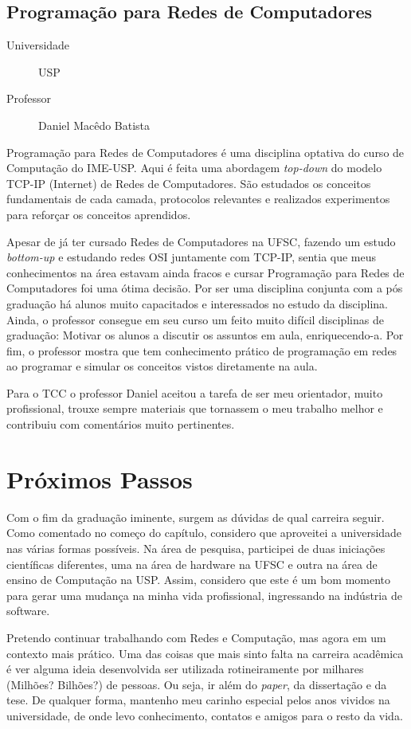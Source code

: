 \subsection{Programação para Redes de Computadores}
\begin{description}
	\item[Universidade] USP
	\item[Professor] Daniel Macêdo Batista
\end{description}

Programação para Redes de Computadores é uma disciplina optativa do curso de
Computação do IME-USP. Aqui é feita uma abordagem \emph{top-down} do modelo
TCP-IP (Internet) de Redes de Computadores. São estudados os conceitos
fundamentais de cada camada, protocolos relevantes e realizados experimentos
para reforçar os conceitos aprendidos.

Apesar de já ter cursado Redes de Computadores na UFSC, fazendo um estudo
\emph{bottom-up} e estudando redes OSI juntamente com TCP-IP, sentia que meus 
conhecimentos na área estavam ainda fracos e cursar Programação para Redes de
Computadores foi uma ótima decisão. Por ser uma disciplina conjunta com a pós
graduação há alunos muito capacitados e interessados no estudo da disciplina.
Ainda, o professor consegue em seu curso um feito muito difícil disciplinas de
graduação: Motivar os alunos a discutir os assuntos em aula, enriquecendo-a.
Por fim, o professor mostra que tem conhecimento prático de programação em redes
ao programar e simular os conceitos vistos diretamente na aula.

Para o TCC o professor Daniel aceitou a tarefa de ser meu orientador, muito 
profissional, trouxe sempre materiais que tornassem o meu trabalho melhor e 
contribuiu com comentários muito pertinentes.


\section{Próximos Passos}
\label{sec:proximos_passos}
Com o fim da graduação iminente, surgem as dúvidas de qual carreira seguir.
Como comentado no começo do capítulo, considero que aproveitei a universidade
nas várias formas possíveis. Na área de pesquisa, participei de duas iniciações
científicas diferentes, uma na área de hardware na UFSC e outra na área de
ensino de Computação na USP. Assim, considero que este é um bom momento para 
gerar uma mudança na minha vida profissional, ingressando na indústria de
software.

Pretendo continuar trabalhando com Redes e Computação, mas agora em um
contexto mais prático. Uma das coisas que mais sinto falta na carreira acadêmica
é ver alguma ideia desenvolvida ser utilizada rotineiramente por milhares
(Milhões? Bilhões?) de pessoas. Ou seja, ir além do \emph{paper}, da dissertação
e da tese. De qualquer forma, mantenho meu carinho especial pelos anos vividos
na universidade, de onde levo conhecimento, contatos e amigos para o resto da
vida.


